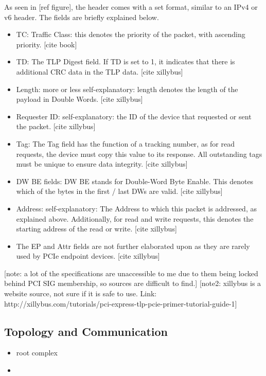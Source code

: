 As seen in [ref figure], the header comes with a set format, similar to an IPv4 or v6 header. The fields are briefly explained below.
\begin{itemize}
\item TC: Traffic Class: this denotes the priority of the packet, with ascending priority. [cite book]
\item TD: The TLP Digest field. If TD is set to 1, it indicates that there is additional CRC data in the TLP data. [cite xillybus]
\item Length: more or less self-explanatory: length denotes the length of the payload in Double Words. [cite xillybus]
\item Requester ID: self-explanatory: the ID of the device that requested or sent the packet. [cite xillybus]
\item Tag: The Tag field has the function of a tracking number, as for read requests, the device must copy this value to its response. All outstanding tags must be unique to ensure data integrity. [cite xillybus]
\item DW BE fields: DW BE stands for Double-Word Byte Enable. This denotes which of the bytes in the first / last DWs are valid. [cite xillybus]
\item Address: self-explanatory: The Address to which this packet is addressed, as explained above. Additionally, for read and write requests, this denotes the starting address of the read or write. [cite xillybus]
\item The EP and Attr fields are not further elaborated upon as they are rarely used by PCIe endpoint devices. [cite xillybus]
\end{itemize}



[note: a lot of the specifications are unaccessible to me due to them being locked behind PCI SIG membership, so sources are difficult to find.]
[note2: xillybus is a website source, not sure if it is safe to use. Link: http://xillybus.com/tutorials/pci-express-tlp-pcie-primer-tutorial-guide-1]

\subsection{Topology and Communication}

\begin{itemize}
\item root complex
\item 
\end{itemize}

